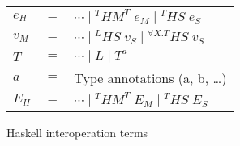 \begin{figure}
\begin{center}
\begin{tabular}{lcl}
$e_{H}$ & $=$ & $\cdots\;\vert\;^{T}HM^{T}\;e_{M}\;\vert\;^{T}HS\;e_{S}$ \\
$v_{M}$ & $=$ & $\cdots\;\vert\;^{L}HS\;v_{S}\;\vert\;^{\forall X.T}HS\;v_{S}$ \\
$T$ & $=$ & $\cdots\;\vert\;L\;\vert\;T^{a}$ \\
$a$ & $=$ & Type annotations (a, b, \ldots) \\
$E_{H}$ & $=$ & $\cdots\;\vert\;^{T}HM^{T}\;E_{M}\;\vert\;^{T}HS\;E_{S}$
\end{tabular}
\end{center}
\caption{Haskell interoperation terms}
\label{fig:hit}
\end{figure}